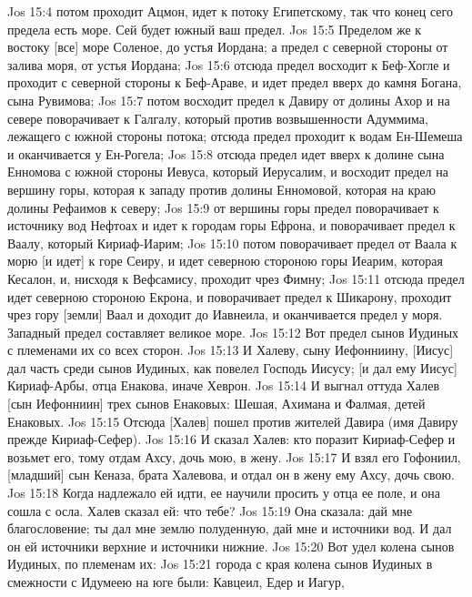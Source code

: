 \vs Jos 15:4 потом проходит Ацмон, идет к потоку Египетскому, так что конец сего предела есть море. Сей будет южный ваш предел.
\vs Jos 15:5 Пределом же к востоку [все] море Соленое, до устья Иордана; а предел с северной стороны  от залива моря, от устья Иордана;
\vs Jos 15:6 отсюда предел восходит к Беф-Хогле и проходит с северной стороны к Беф-Араве, и идет предел вверх до камня Богана, сына Рувимова;
\vs Jos 15:7 потом восходит предел к Давиру от долины Ахор и на севере поворачивает к Галгалу, который против возвышенности Адуммима, лежащего с южной стороны потока; отсюда предел проходит к водам Ен-Шемеша и оканчивается у Ен-Рогела;
\vs Jos 15:8 отсюда предел идет вверх к долине сына Енномова с южной стороны Иевуса, который  Иерусалим, и восходит предел на вершину горы, которая к западу против долины Енномовой, которая на краю долины Рефаимов к северу;
\vs Jos 15:9 от вершины горы предел поворачивает к источнику вод Нефтоах и идет к городам горы Ефрона, и поворачивает предел к Ваалу, который  Кириаф-Иарим;
\vs Jos 15:10 потом поворачивает предел от Ваала к морю [и идет] к горе Сеиру, и идет северною стороною горы Иеарим, которая  Кесалон, и, нисходя к Вефсамису, проходит чрез Фимну;
\vs Jos 15:11 отсюда предел идет северною стороною Екрона, и поворачивает предел к Шикарону, проходит чрез гору [земли] Ваал и доходит до Иавнеила, и оканчивается предел у моря. Западный предел составляет великое море.
\vs Jos 15:12 Вот предел сынов Иудиных с племенами их со всех сторон.
\rsbpar\vs Jos 15:13 И Халеву, сыну Иефонниину, [Иисус] дал часть среди сынов Иудиных, как повелел Господь Иисусу; [и дал ему Иисус] Кириаф-Арбы, отца Енакова, иначе Хеврон.
\vs Jos 15:14 И выгнал оттуда Халев [сын Иефонниин] трех сынов Енаковых: Шешая, Ахимана и Фалмая, детей Енаковых.
\vs Jos 15:15 Отсюда [Халев] пошел против жителей Давира (имя Давиру прежде  Кириаф-Сефер).
\vs Jos 15:16 И сказал Халев: кто поразит Кириаф-Сефер и возьмет его, тому отдам Ахсу, дочь мою, в жену.
\vs Jos 15:17 И взял его Гофониил, [младший] сын Кеназа, брата Халевова, и отдал он в жену ему Ахсу, дочь свою.
\vs Jos 15:18 Когда надлежало ей идти, ее научили просить у отца ее поле, и она сошла с осла. Халев сказал ей: что тебе?
\vs Jos 15:19 Она сказала: дай мне благословение; ты дал мне землю полуденную, дай мне и источники вод. И дал он ей источники верхние и источники нижние.
\rsbpar\vs Jos 15:20 Вот удел колена сынов Иудиных, по племенам их:
\vs Jos 15:21 города с края колена сынов Иудиных в смежности с Идумеею на юге были: Кавцеил, Едер и Иагур,
